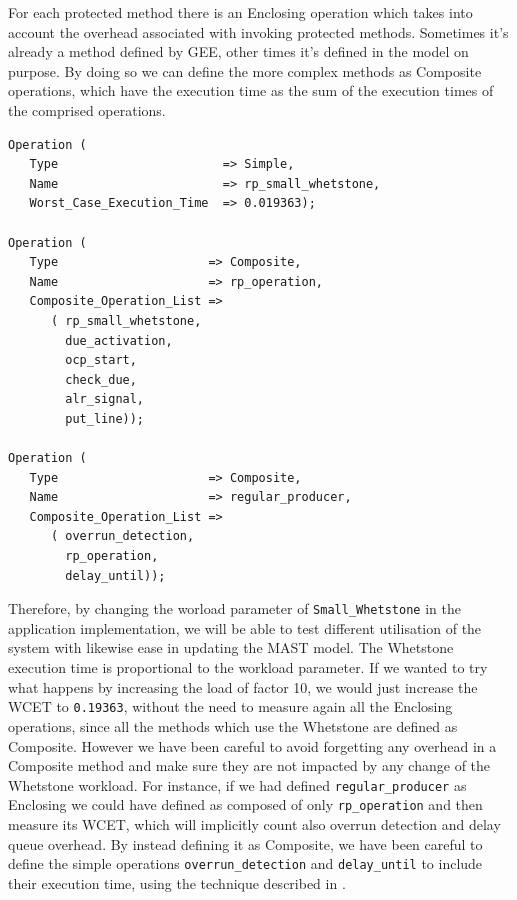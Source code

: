 \documentclass{article}
\begin{document}
For each protected method there is an Enclosing operation which takes into account the overhead associated with invoking protected methods. Sometimes it's already a method defined by GEE, other times it's defined in the model on purpose. By doing so we can define the more complex methods as Composite operations, which have the execution time as the sum of the execution times of the comprised operations.

\begin{lstlisting}
Operation (
   Type                       => Simple,
   Name                       => rp_small_whetstone,
   Worst_Case_Execution_Time  => 0.019363);

Operation (
   Type                     => Composite,
   Name                     => rp_operation,
   Composite_Operation_List =>
      ( rp_small_whetstone,
        due_activation,
        ocp_start,
        check_due,
        alr_signal,
        put_line));

Operation (
   Type                     => Composite,
   Name                     => regular_producer,
   Composite_Operation_List =>
      ( overrun_detection,
        rp_operation,
        delay_until));
\end{lstlisting}

Therefore, by changing the worload parameter of \texttt{Small\_Whetstone} in the application implementation, we will be able to test different utilisation of the system with likewise ease in updating the MAST model. The Whetstone execution time is proportional to the workload parameter. If we wanted to try what happens by increasing the load of factor 10, we would just increase the WCET to \texttt{0.19363}, without the need to measure again all the Enclosing operations, since all the methods which use the Whetstone are defined as Composite. However we have been careful to avoid forgetting any overhead in a Composite method and make sure they are not impacted by any change of the Whetstone workload. For instance, if we had defined \texttt{regular\_producer} as Enclosing we could have defined as composed of only \texttt{rp\_operation} and then measure its WCET, which will implicitly count also overrun detection and delay queue overhead. By instead defining it as Composite, we have been careful to define the simple operations \texttt{overrun\_detection} and \texttt{delay\_until} to include their execution time, using the technique described in \cite{effects-runtime}.
\end{document}
